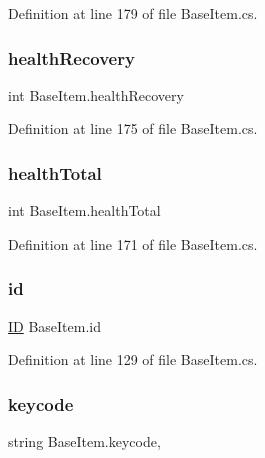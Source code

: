 Definition at line 179 of file Base\+Item.\+cs.

\mbox{\label{class_base_item_acb3bb8b3a0f0d7ae56d7f46216bcf4d5}} 
\subsubsection{\texorpdfstring{healthRecovery}{healthRecovery}}
{\footnotesize\ttfamily int Base\+Item.\+health\+Recovery\hspace{0.3cm}{\ttfamily [get]}}



Definition at line 175 of file Base\+Item.\+cs.

\mbox{\label{class_base_item_acccd778e1b1e14d3820b4d74d71bf1df}} 
\subsubsection{\texorpdfstring{healthTotal}{healthTotal}}
{\footnotesize\ttfamily int Base\+Item.\+health\+Total\hspace{0.3cm}{\ttfamily [get]}}



Definition at line 171 of file Base\+Item.\+cs.

\mbox{\label{class_base_item_a807ae1ffbec79337842d16a380a05e38}} 
\subsubsection{\texorpdfstring{id}{id}}
{\footnotesize\ttfamily \mbox{\hyperlink{class_base_item_add9920d2f5a4fa91752714a8f3ab424b}{ID}} Base\+Item.\+id\hspace{0.3cm}{\ttfamily [get]}}



Definition at line 129 of file Base\+Item.\+cs.

\mbox{\label{class_base_item_a9142991ba3145c20fd476427c3828e60}} 
\subsubsection{\texorpdfstring{keycode}{keycode}}
{\footnotesize\ttfamily string Base\+Item.\+keycode\hspace{0.3cm}{\ttfamily [get]}, {\ttfamily [set]}}



